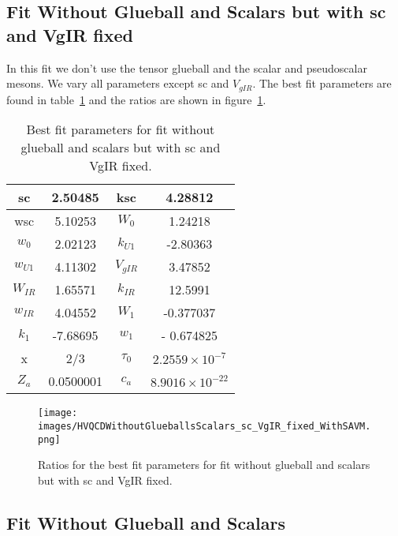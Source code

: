 \documentclass[10 pt]{article}
\begin{document}
\subsection{Fit Without Glueball and Scalars but with sc and VgIR fixed}

In this fit we don't use the tensor glueball and the scalar and pseudoscalar mesons. We vary all parameters except sc and $V_{gIR}$. The best fit parameters are found in table~\ref{table: fit without glueball scalars sc VgIR fixed} and the ratios are shown in figure~\ref{figure: fit without glueball scalars sc VgIR fixed}.

\begin{table}
\centering
\begin{tabular}{ | c | c | c | c |}
\hline
sc & 2.50485 & ksc & 4.28812 \\
\hline
wsc & 5.10253 & $W_0$ & 1.24218 \\
\hline
$w_0$ & 2.02123 & $k_{U1}$ & -2.80363  \\
\hline
$w_{U1}$ & 4.11302 & $V_{gIR}$ & 3.47852 \\
\hline
$W_{IR}$ & 1.65571 & $k_{IR}$ & 12.5991 \\
\hline
$w_{IR}$ & 4.04552 & $W_1$ & -0.377037 \\
\hline
$k_1$ & -7.68695 & $w_1$ & - 0.674825 \\
\hline
x & 2/3 & $\tau_0$ & $2.2559 \times 10^{-7}$\\
\hline
$Z_a$ & 0.0500001 & $c_a$ & $8.9016 \times 10^{-22}$ \\
\hline
\end{tabular}
\caption{Best fit parameters for fit without glueball and scalars but with sc and VgIR fixed.}
\label{table: fit without glueball scalars sc VgIR fixed} 
\end{table}



\begin{figure}
  \center
  \texttt{[image: images/HVQCDWithoutGlueballsScalars\_sc\_VgIR\_fixed\_WithSAVM.png]} 
  \caption{Ratios for the best fit parameters for fit without glueball and scalars but with sc and VgIR fixed.}
   \label{figure: fit without glueball scalars sc VgIR fixed}
\end{figure}


\subsection{Fit Without Glueball and Scalars}
\end{document}
